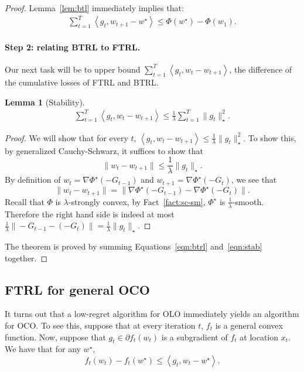 \documentclass{article}
\newtheorem{lemma}{Lemma}
\newcommand{\inner}[2]{\left\langle #1,#2 \right\rangle}
\begin{document}
\begin{proof}
Lemma~\ref{lem:btl} immediately implies that:
\begin{eqnarray}
  \sum_{t=1}^T \inner{g_t}{w_{t+1} - w^\star} \leq \Phi(w^\star) - \Phi(w_1).
  \label{eqn:btrl}
\end{eqnarray}


\paragraph{Step 2: relating BTRL to FTRL.} Our next task will be to upper bound $\sum_{t=1}^T \inner{g_t}{w_{t} - w_{t+1}}$, the difference of the cumulative losses of FTRL and BTRL.

\begin{lemma}[Stability]
\begin{eqnarray}
  \sum_{t=1}^T \inner{g_t}{w_{t} - w_{t+1}} \leq \frac1 \lambda \sum_{t=1}^T \| g_t \|_\star^2.
  \label{eqn:stab}
\end{eqnarray}
\end{lemma}
\begin{proof}
We will show that for every $t$, $\inner{g_t}{w_{t} - w_{t+1}} \leq \frac1\lambda \| g_t \|_\star^2$. To show this, by generalized Cauchy-Schwarz, it suffices to show that
\[ \| w_t - w_{t+1} \| \leq \frac1\lambda \| g_t \|_\star. \]
By definition of $w_t = \nabla \Phi^\star(-G_{t-1})$ and $w_{t+1} = \nabla \Phi^\star(-G_t)$, we see that
\[ \| w_t - w_{t+1} \| = \| \nabla \Phi^\star(-G_{t-1}) - \nabla \Phi^\star(-G_t) \|. \]
Recall that $\Phi$ is $\lambda$-strongly convex, by Fact~\ref{fact:sc-sm}, $\Phi^\star$ is $\frac1\lambda$-smooth. Therefore the right hand side is indeed at most
$\frac1\lambda \| -G_{t-1} - (-G_t)\| = \frac1\lambda \| g_t \|_\star$.
\end{proof}

The theorem is proved by summing Equations~\eqref{eqn:btrl} and~\eqref{eqn:stab} together.
\end{proof}

\subsection{FTRL for general OCO}
It turns out that a low-regret algorithm for OLO immediately yields an algorithm for OCO.
To see this, suppose that at every iteration $t$, $f_t$ is a general convex function.
Now, suppose that $g_t \in \partial f_t(w_t)$ is a subgradient of $f_t$ at location $x_t$.
We have that for any $w^\star$,
\[ f_t(w_t) - f_t(w^\star) \leq \inner{g_t}{w_t - w^\star}. \]
\end{document}
